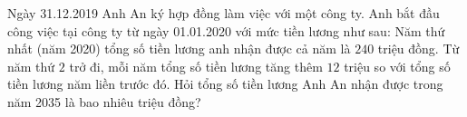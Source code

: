 \begin{ex}
Ngày 31.12.2019 Anh An ký hợp đồng làm việc với một công ty. Anh bắt đầu công việc tại công ty từ ngày 01.01.2020 với mức tiền lương như sau: Năm thứ nhất (năm 2020) tổng số tiền lương anh nhận được cả năm là $240$ triệu đồng. Từ năm thứ $2$ trở đi, mỗi năm tổng số tiền lương tăng thêm $12$ triệu so với tổng số tiền lương năm liền trước đó. Hỏi tổng số tiền lương Anh An nhận được trong năm 2035 là bao nhiêu triệu đồng?
\end{ex}
